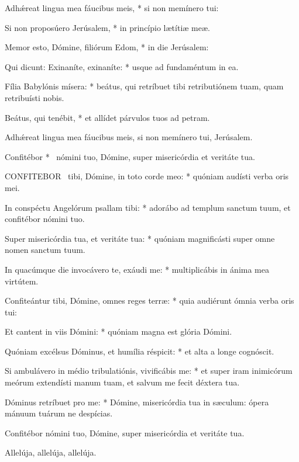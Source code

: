 Adhǽreat lingua mea fáucibus meis, * si non memínero tui:

Si non proposúero Jerúsalem, * in princípio lætítiæ meæ.

Memor esto, Dómine, filiórum Edom, * in die Jerúsalem:

Qui dicunt: Exinaníte, exinaníte: * usque ad fundaméntum in ea.

Fília Babylónis mísera: * beátus, qui retríbuet tibi retributiónem tuam, quam retribuísti nobis.

Beátus, qui tenébit, * et allídet párvulos tuos ad petram.

 Adhǽreat lingua mea fáucibus meis, si non memínero tui, Jerúsalem.

 Confitébor * \textdagger\ nómini tuo, Dómine, super misericórdia et veritáte tua.


\lettrine[lines=2]{C}{ONFITEBOR} \textdagger\ tibi, Dómine, in toto corde meo: * quóniam audísti verba oris mei.

In conspéctu Angelórum psallam tibi: * adorábo ad templum sanctum tuum, et confitébor nómini tuo.

Super misericórdia tua, et veritáte tua: * quóniam magnificásti super omne nomen sanctum tuum.

In quacúmque die invocávero te, exáudi me: * multiplicábis in ánima mea virtútem.

Confiteántur tibi, Dómine, omnes reges terræ: * quia audiérunt ómnia verba oris tui:

Et cantent in viis Dómini: * quóniam magna est glória Dómini.

Quóniam excélsus Dóminus, et humília réspicit: * et alta a longe cognóscit.

Si ambulávero in médio tribulatiónis, vivificábis me: * et super iram inimicórum meórum extendísti manum tuam, et salvum me fecit déxtera tua.

Dóminus retríbuet pro me: * Dómine, misericórdia tua in sæculum: ópera mánuum tuárum ne despícias.


 Confitébor nómini tuo, Dómine, super misericórdia et veritáte tua.


 Allelúja, allelúja, allelúja.


